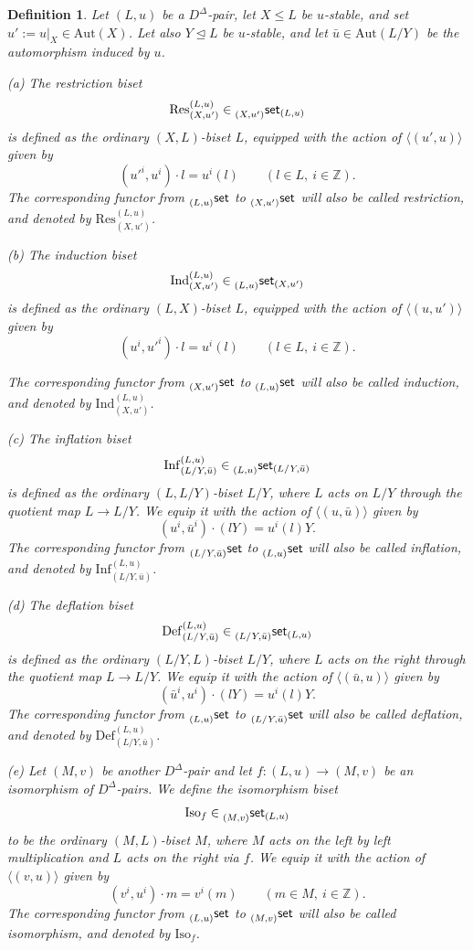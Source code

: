 \documentclass[11pt]{article}
\theoremstyle{change}  %
\newtheorem{definition}[theorem]{Definition}
\newcommand{\Aut}{\mathrm{Aut}}
\newcommand{\catfont}{\mathsf}
\newcommand{\Def}{\mathrm{Def}}
\newcommand{\Ind}{\mathrm{Ind}}
\newcommand{\Inf}{\mathrm{Inf}}
\newcommand{\Isom}{\mathrm{Iso}}
\newcommand{\lset}[1]{\llap{\phantom{|}}_{#1}\catfont{set}}
\newcommand{\Res}{\mathrm{Res}}
\newcommand{\ZZ}{\mathbb{Z}}
\newcommand{\DD}{D^{\Delta}}
\newcommand{\pset}[1]{\lset{#1}}
\newcommand{\lbiset}[2]{\llap{\phantom{|}}_{#1}\catfont{set}_{#2}}
\begin{document}
\begin{definition}
	Let $(L,u)$ be a $\DD$-pair, let $X\leq L$ be $u$-stable, and set $u':=u|_X\in\Aut(X)$. Let also $Y\unlhd L$ be $u$-stable, and let	$\bar u\in\Aut(L/Y)$ be the automorphism induced by $u$.
	
	\smallskip
	{\rm (a)} The \emph{restriction} biset
	\[
	\Res^{(L,u)}_{(X,u')}\in \lbiset{(X,u')}{(L,u)}
	\]
	is defined as the ordinary $(X,L)$-biset $L$, equipped with the action of
	$\langle(u',u)\rangle$ given by
	\[
	(u'^i,u^i)\cdot l=u^i(l)\qquad (l\in L,\ i\in\ZZ).
	\]
	The corresponding functor from $\pset{(L,u)}$ to $\pset{(X,u')}$ will also be called {\em restriction}, and denoted by  $\Res^{(L,u)}_{(X,u')}$.

	\smallskip
	{\rm (b)} The \emph{induction} biset
	\[
	\Ind^{(L,u)}_{(X,u')} \in \lbiset{(L,u)}{(X,u')}
	\]
	is defined as the ordinary $(L,X)$-biset $L$, equipped with the action of
	$\langle(u,u')\rangle$ given by
	\[
	(u^i,u'^i)\cdot l=u^i(l) \qquad (l\in L,\ i\in\ZZ).
	\]
	
	The corresponding functor from $\pset{(X,u')}$ to $\pset{(L,u)}$ will also be called {\em induction}, and denoted by  $\Ind^{(L,u)}_{(X,u')}$.

	\smallskip
	{\rm (c)} The \emph{inflation} biset
	\[
	\Inf^{(L,u)}_{(L/Y,\bar u)} \in \lbiset{(L,u)}{(L/Y, \bar u)}
	\]
	is defined as the ordinary $(L,L/Y)$-biset $L/Y$, where $L$ acts on $L/Y$ through the quotient map $L\to L/Y$. We equip it with the action of $\langle(u,\bar u)\rangle$ given by
	\[
	(u^i,\bar u^i)\cdot(lY)=u^i(l)Y.
	\]
	The corresponding functor from $\pset{(L/Y,\bar{u})}$ to $\pset{(L,u)}$ will also be called {\em inflation}, and denoted by  $\Inf^{(L,u)}_{(L/Y,\bar{u})}$.

	\smallskip
	{\rm (d)} The \emph{deflation} biset
	\[
	\Def^{(L,u)}_{(L/Y,\bar u)} \in \lbiset{(L/Y,\bar u)}{(L,u)}
	\]
	is defined as the ordinary $(L/Y,L)$-biset $L/Y$, where $L$ acts on the	right through the quotient map $L\to L/Y$. We equip it with the action of $\langle(\bar u,u)\rangle$ given by
	\[
	(\bar u^i,u^i)\cdot(lY)=u^i(l)Y.
	\]
		The corresponding functor from $\pset{(L,u)}$ to $\pset{(L/Y,\bar{u})}$ will also be called {\em deflation}, and denoted by  $\Def^{(L,u)}_{(L/Y,\bar{u})}$.

	\smallskip
	{\rm (e)} Let $(M,v)$ be another $\DD$-pair and let $f: (L,u)\longrightarrow (M,v)$ be an isomorphism of $\DD$-pairs. We define the \emph{isomorphism} biset
	\[
	\Isom_f \in \lbiset{(M,v)}{(L,u)}
	\]
	to be the ordinary $(M,L)$-biset $M$, where $M$ acts on the left by left multiplication and $L$ acts on the right via $f$. We equip it with the action of $\langle(v,u)\rangle$ given by
	\[
	(v^i,u^i)\cdot m=v^i(m)
	\qquad (m\in M,\ i\in\ZZ).
	\]
		The corresponding functor from $\pset{(L,u)}$ to $\pset{(M,v)}$ will also be called {\em isomorphism}, and denoted by $\Isom_f$.
\end{definition}
\end{document}
